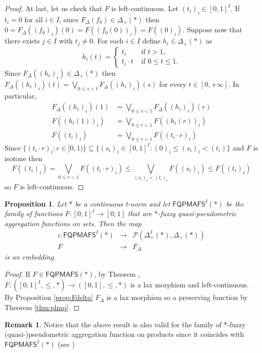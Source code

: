 \documentclass[11pt,a4paper]{amsart}
\newtheorem{proposition}[theorem]{Proposition}
\theoremstyle{definition}
\newtheorem{remark}[theorem]{Remark}
\begin{document}
\begin{proof}
		At last, let us check that $F$ is left-continuous. Let $(t_i)_i\in [0,1]^I.$ If $t_i=0$ for all $i\in I$, since $F_\Delta(f_0)\in\Delta_+(\ast)$ then $0=F_\Delta((f_0)_i)(0)=F((f_0(0))_i)=F((0)_i).$ Suppose now that there exists $j\in I$ with $t_j\neq 0.$ For each $i\in I$ define $h_i\in \Delta_+(\ast)$ as
		$$h_i(t)=\begin{cases}
			t_i&\text{ if }t>1,\\
			t_i\cdot t&\text{ if }0\leq t\leq 1.
		\end{cases}$$
		Since $F_\Delta((h_i)_i)\in\Delta_+(\ast)$ then $F_\Delta((h_i)_i)(t)=\bigvee_{0\leq s<t}F_\Delta((h_i)_i)(s)$ for every $t\in [0,+\infty].$ In particular,
		\begin{align*}
			F_\Delta((h_i)_i)(1)&=\bigvee_{0\leq s<1}F_\Delta((h_i)_i)(r)\\
			F((h_i(1))_i)&=\bigvee_{0\leq r<1}F((h_i(r))_i)\\
			F((t_i)_i)&=\bigvee_{0\leq r<1}F((t_i\cdot r)_i)
		\end{align*}
		Since $\{(t_i\cdot r)_i:r\in [0,1)\}\subseteq \{(s_i)_i\in [0,1]^I: (0)_i\leq (s_i)_i<(t_i)\}$ and $F$ is isotone then 
		$$F((t_i)_i)=\bigvee_{0\leq r<1}F((t_i\cdot r)_i)\leq\bigvee_{(s_i)_i<(t_i)_i}F((s_i)_i)\leq F((t_i)_i) $$ so $F$ is left-continuous.
	\end{proof}
	
	
	\begin{proposition}\label{prop::DeltaEmbedding}
		Let $\ast$ be a continuous t-norm and let $\mathsf{FQPMAFS}^I(\ast)$ be the family of functions $F:[0,1]^I\to [0,1]$ that are $\ast$-fuzzy quasi-pseudometric aggregation functions on sets. Then the map
		$$\begin{array}{ccc}
			
			\iota:\mathsf{FQPMAFS}^I(\ast)&\to&\mathscr{P}(\Delta_+^I(\ast),\Delta_+(\ast))\\[5pt]
			F&\to&F_\Delta
		\end{array}$$
		is an embedding.    
	\end{proposition}
	
	
	\begin{proof}
		If $F\in \mathsf{FQPMAFS}(\ast)$, by Theorem \cite[Theorem 4.21]{PRLVale21}, $F:([0,1]^I,\leq,\ast)\to ([0,1],\leq,\ast)$ is a lax morphism and left-continuous. By Proposition \ref{prop:Fdelta} $F_\Delta$ is a lax morphism so a preserving function by Theorem \ref{thm:plmq}. 
	\end{proof} 
	
	\begin{remark}
		Notice that the above result is also valid for the family of $\ast$-fuzzy (quasi-)pseudometric aggregation function on products since it coincides with $\mathsf{FQPMAFS}^I(\ast)$ (see \cite[Theorem 4.21]{PRLVale21})
	\end{remark}
	
\end{document}
